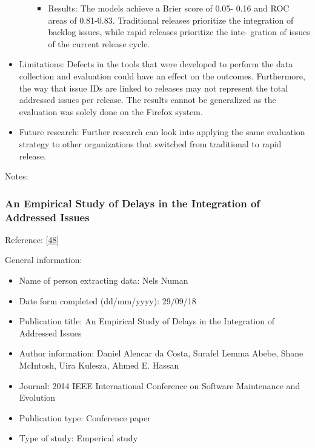 \documentclass[]{book}
\providecommand{\tightlist}{%
  \setlength{\itemsep}{0pt}\setlength{\parskip}{0pt}}
\begin{document}
\begin{itemize}
\begin{itemize}
    \begin{itemize}
    \tightlist
    \item
      Results: The models achieve a Brier score of 0.05- 0.16 and ROC
      areas of 0.81-0.83. Traditional releases prioritize the
      integration of backlog issues, while rapid releases prioritize the
      inte- gration of issues of the current release cycle.
    \end{itemize}
  \end{itemize}
\item
  Limitations: Defects in the tools that were developed to perform the
  data collection and evaluation could have an effect on the outcomes.
  Furthermore, the way that issue IDs are linked to releases may not
  represent the total addressed issues per release. The results cannot
  be generalized as the evaluation was solely done on the Firefox
  system.
\item
  Future research: Further research can look into applying the same
  evaluation strategy to other organizations that switched from
  traditional to rapid release.
\end{itemize}

Notes:

\subsubsection{An Empirical Study of Delays in the Integration of
Addressed
Issues}\label{an-empirical-study-of-delays-in-the-integration-of-addressed-issues}

Reference: {[}\protect\hyperlink{ref-da2014a}{48}{]}

General information:

\begin{itemize}
\tightlist
\item
  Name of person extracting data: Nels Numan
\item
  Date form completed (dd/mm/yyyy): 29/09/18
\item
  Publication title: An Empirical Study of Delays in the Integration of
  Addressed Issues
\item
  Author information: Daniel Alencar da Costa, Surafel Lemma Abebe,
  Shane McIntosh, Uira Kulesza, Ahmed E. Hassan
\item
  Journal: 2014 IEEE International Conference on Software Maintenance
  and Evolution
\item
  Publication type: Conference paper
\item
  Type of study: Emperical study
\end{itemize}
\end{document}

